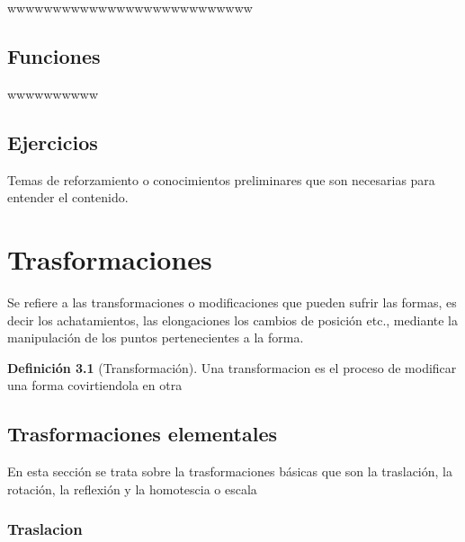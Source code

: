 \documentclass[
  16pt,
]{krantz}
\theoremstyle{definition}
\newtheorem{definition}{Definición}[chapter]
\theoremstyle{definition}
\theoremstyle{definition}
\theoremstyle{definition}
\theoremstyle{remark}
\begin{document}
wwwwwwwwwwwwwwwwwwwwwwwwwww

\hypertarget{funciones}{%
\section{Funciones}\label{funciones}}

wwwwwwwwww \citep{vincze2014college}

\hypertarget{ejercicios-1}{%
\section{Ejercicios}\label{ejercicios-1}}

\hypertarget{appendix-apendice}{%
\appendix {}}


Temas de reforzamiento o conocimientos preliminares que son necesarias para entender el contenido.

\hypertarget{trasformaciones}{%
\chapter{Trasformaciones}\label{trasformaciones}}

Se refiere a las transformaciones o modificaciones que pueden sufrir las formas, es decir los achatamientos, las elongaciones los cambios de posición etc., mediante la manipulación de los puntos pertenecientes a la forma.

\begin{definition}[Transformación]
\protect\hypertarget{def:transformacion}{}\label{def:transformacion}Una transformacion es el proceso de modificar una forma covirtiendola en otra
\end{definition}

\hypertarget{trasformaciones-elementales}{%
\section{Trasformaciones elementales}\label{trasformaciones-elementales}}

En esta sección se trata sobre la trasformaciones básicas que son la traslación, la rotación, la reflexión y la homotescia o escala

\hypertarget{traslacion}{%
\subsection{Traslacion}\label{traslacion}}
\end{document}
